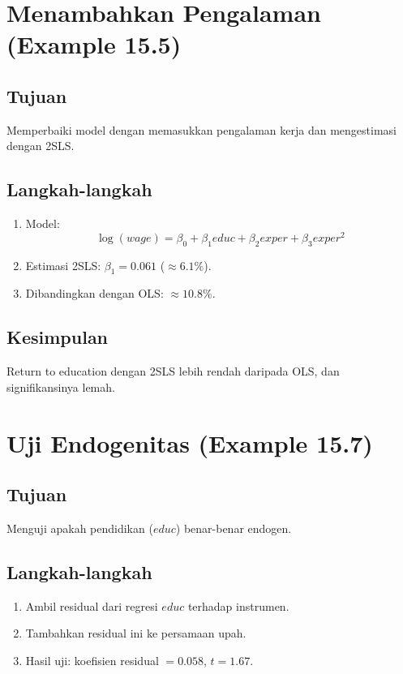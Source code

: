 \documentclass[]{article}
\begin{document}
\section{Menambahkan Pengalaman (Example 15.5)}
\subsection*{Tujuan}
Memperbaiki model dengan memasukkan pengalaman kerja dan mengestimasi dengan 2SLS.

\subsection*{Langkah-langkah}
\begin{enumerate}
    \item Model:
    \[
    \log(wage) = \beta_0 + \beta_1 educ + \beta_2 exper + \beta_3 exper^2
    \]
    \item Estimasi 2SLS: $\beta_1 = 0.061$ ($\approx 6.1\%$).
    \item Dibandingkan dengan OLS: $\approx 10.8\%$.
\end{enumerate}

\subsection*{Kesimpulan}
Return to education dengan 2SLS lebih rendah daripada OLS, dan signifikansinya lemah.

\section{Uji Endogenitas (Example 15.7)}
\subsection*{Tujuan}
Menguji apakah pendidikan ($educ$) benar-benar endogen.

\subsection*{Langkah-langkah}
\begin{enumerate}
    \item Ambil residual dari regresi $educ$ terhadap instrumen.
    \item Tambahkan residual ini ke persamaan upah.
    \item Hasil uji: koefisien residual $= 0.058$, $t = 1.67$.
\end{enumerate}
\end{document}
